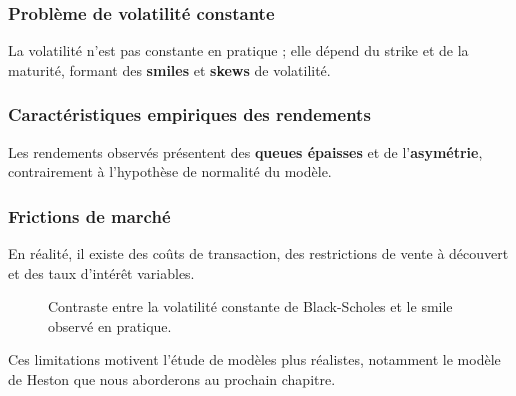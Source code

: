 \subsubsection{Problème de volatilité constante}

La volatilité n'est pas constante en pratique ; elle dépend du strike et de la maturité, formant des \textbf{smiles} et \textbf{skews} de volatilité.

\subsubsection{Caractéristiques empiriques des rendements}

Les rendements observés présentent des \textbf{queues épaisses} et de l'\textbf{asymétrie}, contrairement à l'hypothèse de normalité du modèle.

\subsubsection{Frictions de marché}

En réalité, il existe des coûts de transaction, des restrictions de vente à découvert et des taux d'intérêt variables.

\begin{figure}[H]
	\centering
	\caption{Contraste entre la volatilité constante de Black-Scholes et le smile observé en pratique.}
	\label{fig:volatility_smile}
\end{figure}

Ces limitations motivent l'étude de modèles plus réalistes, notamment le modèle de Heston que nous aborderons au prochain chapitre.

